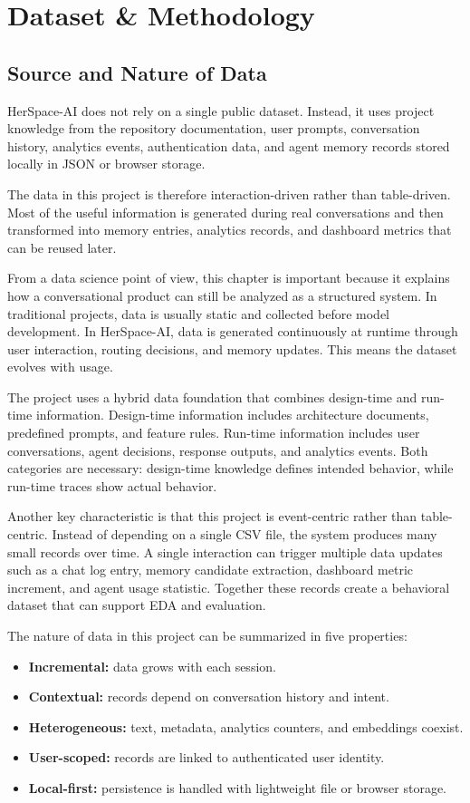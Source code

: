 \documentclass[oneside,a4paper,12pt]{report}
\begin{document}
\chapter{Dataset \& Methodology}
\section{Source and Nature of Data}
HerSpace-AI does not rely on a single public dataset. Instead, it uses project knowledge from the repository documentation, user prompts, conversation history, analytics events, authentication data, and agent memory records stored locally in JSON or browser storage.

The data in this project is therefore interaction-driven rather than table-driven. Most of the useful information is generated during real conversations and then transformed into memory entries, analytics records, and dashboard metrics that can be reused later.

From a data science point of view, this chapter is important because it explains how a conversational product can still be analyzed as a structured system. In traditional projects, data is usually static and collected before model development. In HerSpace-AI, data is generated continuously at runtime through user interaction, routing decisions, and memory updates. This means the dataset evolves with usage.

The project uses a hybrid data foundation that combines design-time and run-time information. Design-time information includes architecture documents, predefined prompts, and feature rules. Run-time information includes user conversations, agent decisions, response outputs, and analytics events. Both categories are necessary: design-time knowledge defines intended behavior, while run-time traces show actual behavior.

Another key characteristic is that this project is event-centric rather than table-centric. Instead of depending on a single CSV file, the system produces many small records over time. A single interaction can trigger multiple data updates such as a chat log entry, memory candidate extraction, dashboard metric increment, and agent usage statistic. Together these records create a behavioral dataset that can support EDA and evaluation.

The nature of data in this project can be summarized in five properties:
\begin{itemize}
    \item \textbf{Incremental:} data grows with each session.
    \item \textbf{Contextual:} records depend on conversation history and intent.
    \item \textbf{Heterogeneous:} text, metadata, analytics counters, and embeddings coexist.
    \item \textbf{User-scoped:} records are linked to authenticated user identity.
    \item \textbf{Local-first:} persistence is handled with lightweight file or browser storage.
\end{itemize}
\end{document}
